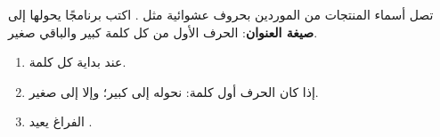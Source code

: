 \begin{statement}
تصل أسماء المنتجات من الموردين بحروف عشوائية مثل . اكتب برنامجًا يحولها إلى \textbf{صيغة العنوان}: الحرف الأول من كل كلمة كبير والباقي صغير.
\end{statement}
\begin{stepsbox}\begin{enumerate}
\item {} عند بداية كل كلمة.
\item إذا كان الحرف أول كلمة: نحوله إلى كبير؛ وإلا إلى صغير.
\item الفراغ يعيد .
\end{enumerate}\end{stepsbox}
